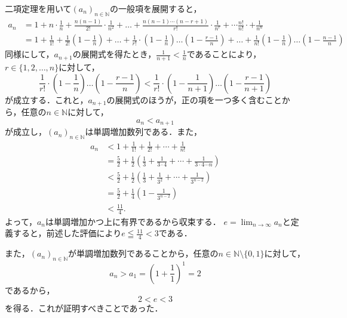 \begin{tproof}
    二項定理を用いて$(a_n)_{n \in \mathbb{N}}$の一般項を展開すると，
    \begin{align*}
        a_n & =  1 + n \cdot \frac{1}{n} + \frac{n(n-1)}{2!} \cdot \frac{1}{n^2} + \dots + \frac{n(n-1)\cdots(n-r+1)}{r!} \cdot \frac{1}{n^r} + \cdots \frac{n!}{n!} \cdot + \frac{1}{n^n}                                                                              \\
            & = 1+ \frac{1}{1!} + \frac{1}{2!} \left(1- \frac{1}{n} \right) + \dots + \frac{1}{r!} \cdot  \left(1 - \frac{1}{n} \right) \dots \left (1-\frac{r-1}{n} \right) + \dots +  \frac{1}{n!} \left(1 - \frac{1}{n} \right) \dots \left(1- \frac{n-1}{n} \right)
    \end{align*}
    同様にして，$a_{n+1}$の展開式を得たとき，$ \frac{1}{n+1} < \frac{1}{n}$であることにより，$r\in \{ 1,2,\dots ,n\}$に対して，
    \[
        \frac{1}{r!} \cdot  \left(1 - \frac{1}{n} \right) \dots \left (1-\frac{r-1}{n} \right) < \frac{1}{r!} \cdot  \left(1 - \frac{1}{n+1} \right) \dots \left (1-\frac{r-1}{n+1} \right)
    \]
    が成立する．これと，$a_{n+1}$の展開式のほうが，正の項を一つ多く含むことから，任意の$n \in \mathbb{N}$に対して，
    \[
        a_{n} < a_{n+1}
    \]
    が成立し，$(a_n)_{n \in \mathbb{N}}$は単調増加数列である．また，
    \begin{align*}
        a_n
         & < 1 + \frac{1}{1!} + \frac{1}{2!} + \cdots + \frac{1}{n!}                                                         \\
         & = \frac{5}{2} + \frac{1}{2}\left(\frac{1}{3} + \frac{1}{3 \cdot 4} + \cdots + \frac{1}{3 \cdot 4 \cdots n}\right) \\
         & < \frac{5}{2} + \frac{1}{2}\left(\frac{1}{3} + \frac{1}{3^2} + \cdots + \frac{1}{3^{n-2}}\right)                  \\
         & = \frac{5}{2} + \frac{1}{4}\left(1 - \frac{1}{3^{n-2}}\right)                                                     \\
         & < \frac{11}{4}.
    \end{align*}
    よって，$a_n$は単調増加かつ上に有界であるから収束する．
    $e = \lim_{n \to \infty} a_n$と定義すると，前述した評価により$e \leqq \frac{11}{4} < 3$である．

    また，$(a_n)_{n \in \mathbb{N}}$が単調増加数列であることから，任意の$n \in \mathbb{N} \setminus \{0,1\}$に対して，
    \[
        a_n > a_1 = \left(1+\frac{1}{1}\right)^1 =2
    \]
    であるから，
    \[
        2<e<3
    \]
    を得る．これが証明すべきことであった．
\end{tproof}



